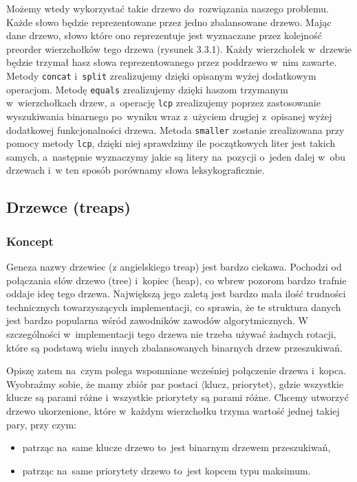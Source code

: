 \documentclass[declaration,shortabstract]{iithesis}
\theoremstyle{definition} \newtheorem{definition}{Definicja}[chapter]
\theoremstyle{plain} \newtheorem{remark}[definition]{Obserwacja}
\theoremstyle{plain} \newtheorem{theorem}[definition]{Twierdzenie}
\theoremstyle{plain} \newtheorem{example}{Przykład}[definition]
\theoremstyle{plain} \newtheorem{lemma}[definition]{Lemat}
\begin{document}
Możemy wtedy wykorzystać takie drzewo do~rozwiązania naszego problemu. Każde słowo będzie reprezentowane przez jedno zbalansowane drzewo. Mając dane drzewo, słowo które ono reprezentuje jest wyznaczane przez kolejność preorder wierzchołków tego drzewa (rysunek 3.3.1). Każdy wierzchołek w~drzewie będzie trzymał hasz słowa reprezentowanego przez poddrzewo w~nim zawarte. Metody \texttt{concat} i~\texttt{split} zrealizujemy dzięki opisanym wyżej dodatkowym operacjom. Metodę \texttt{equals} zrealizujemy dzięki haszom trzymanym w~wierzchołkach drzew, a~operację \texttt{lcp} zrealizujemy poprzez zastosowanie wyszukiwania binarnego po~wyniku wraz z~użyciem drugiej z~opisanej wyżej dodatkowej funkcjonalności drzewa. Metoda \texttt{smaller} zostanie zrealizowana przy pomocy metody \texttt{lcp}, dzięki niej sprawdzimy ile początkowych liter jest takich samych, a~następnie wyznaczymy jakie są litery na~pozycji o~jeden dalej w~obu drzewach i~w ten sposób porównamy słowa leksykograficznie.

\subsection{Drzewce (treaps)}

\subsubsection{Koncept}

Geneza nazwy drzewiec (z angielskiego treap) jest bardzo ciekawa. Pochodzi od połączania słów drzewo (tree) i~kopiec (heap), co wbrew pozorom bardzo trafnie oddaje ideę tego drzewa. Największą jego zaletą jest bardzo mała ilość trudności technicznych towarzyszących implementacji, co sprawia, że te struktura danych jest bardzo popularna wśród zawodników zawodów algorytmicznych. W szczególności w~implementacji tego drzewa nie trzeba używać żadnych rotacji, które są podstawą wielu innych zbalansowanych binarnych drzew przeszukiwań.

Opiszę zatem na~czym polega wspomniane wcześniej połączenie drzewa i~kopca. Wyobraźmy sobie, że mamy zbiór par postaci $\langle$klucz, priorytet$\rangle$, gdzie wszystkie klucze są parami różne i~wszystkie priorytety są parami różne. Chcemy utworzyć drzewo ukorzenione, które w~każdym wierzchołku trzyma wartość jednej takiej pary, przy czym:
\begin{itemize}
    \item patrząc na~same klucze drzewo to~jest binarnym drzewem przeszukiwań,
    \item patrząc na~same priorytety drzewo to~jest kopcem typu maksimum.
\end{itemize}
\end{document}
